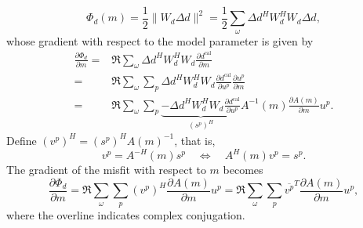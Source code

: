 \documentclass{article}
\begin{document}
\begin{equation}
\Phi_d(m) = \frac{1}{2}\|W_d\Delta d\|^2=\frac{1}{2}\sum_\omega \Delta d^H W_d^H W_d\Delta d,
\end{equation}
whose gradient with respect to the model parameter is given by
\begin{equation}
  \begin{aligned}
  \frac{\partial \Phi_d}{\partial m}=&\Re\sum_\omega \Delta d^H W_d^H W_d\frac{\partial d^{\mathrm{cal}}}{\partial m}\\
  =&\Re\sum_\omega \sum_p\Delta d^H W_d^H W_d\frac{\partial d^{\mathrm{cal}}}{\partial u^p}\frac{\partial u^p}{\partial m}\\
  =&\Re\sum_\omega \sum_p \underbrace{-\Delta d^H W_d^H W_d\frac{\partial d^{\mathrm{cal}}}{\partial u^p}}_{(s^p)^H} A^{-1}(m)\frac{\partial A(m)}{\partial m}u^p.
  \end{aligned}
\end{equation}
Define $(v^p)^H = (s^p)^H A(m)^{-1}$, that is,
\begin{equation}\label{eq:adj}
v^p = A^{-H}(m) s^p \quad\Leftrightarrow\quad A^H(m) v^p = s^p.
\end{equation}
The gradient of the misfit with respect to $m$ becomes
\begin{equation}
\frac{\partial \Phi_d}{\partial m}=\Re\sum_\omega \sum_p (v^p)^H\frac{\partial A(m)}{\partial m}u^p
=\Re \sum_\omega \sum_p \overline{v^p}^T \frac{\partial A(m)}{\partial m} u^p,
\end{equation}
where the overline indicates complex conjugation.
\end{document}
